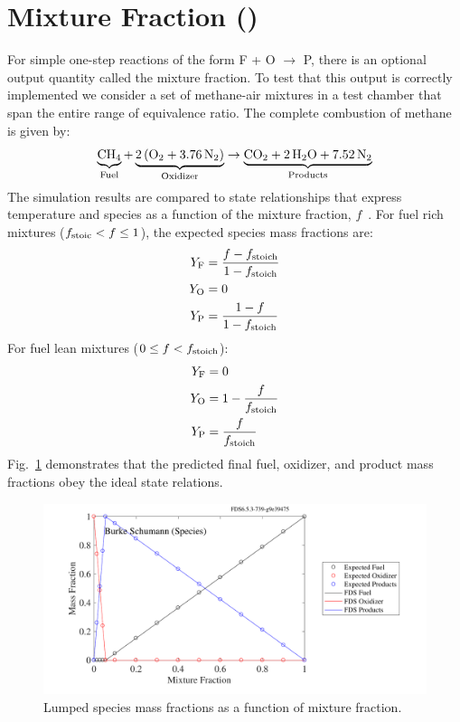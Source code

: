 \documentclass[11pt]{book}
\begin{document}
\clearpage

\section{Mixture Fraction ()}
\label{Mix_Frac}

For simple one-step reactions of the form F + O $\rightarrow$ P, there is an optional output quantity called the mixture fraction. To test that this output is correctly implemented we consider a set of methane-air mixtures in a test chamber that span the entire range of equivalence ratio. The complete combustion of methane is given by:
\begin{equation}\label{eq:methane_ex2}
\underbrace{\mathrm{CH_4}}_{\rm Fuel} + \underbrace{\mathrm{2\,(O_2 + 3.76\,N_2)}}_{\rm Oxidizer} \rightarrow  \underbrace{\mathrm{CO_2 + 2\, H_2O + 7.52\,N_2}}_{\rm Products}
\end{equation}
The simulation results are compared to state relationships that express temperature and species as a function of the mixture fraction, $f$~\cite{Turns:1996}. For fuel rich mixtures ($f_{\rm stoic} < f \le 1$), the expected species mass fractions are:
\begin{align}\label{eq:mix_relate_rich}
Y_{\rm F} &= \frac{f-f_{\rm stoich}}{1-f_{\rm stoich}} \\
Y_{\rm O} &= 0 \\
Y_{\rm P} &= \frac{1-f}{1-f_{\rm stoich}}
\end{align}
For fuel lean mixtures ($0 \le f < f_{\rm stoich}$):
\begin{align}\label{eq:mix_relate_lean}
Y_{\rm F} &= 0 \\
Y_{\rm O} &= 1- \frac{f}{f_{\rm stoich}} \\
Y_{\rm P} &= \frac{f}{f_{\rm stoich}}
\end{align}
Fig.~\ref{fig:burke_schumann_spec} demonstrates that the predicted final fuel, oxidizer, and product mass fractions obey the ideal state relations.
\begin{figure}
\begin{center}
\includegraphics[height=2.2in]{SCRIPT_FIGURES/burke_schumann_spec}
\end{center}
\caption[Mixture fraction state relations for species ()]{Lumped species mass fractions as a function of mixture fraction.}
\label{fig:burke_schumann_spec}
\end{figure}
\end{document}
